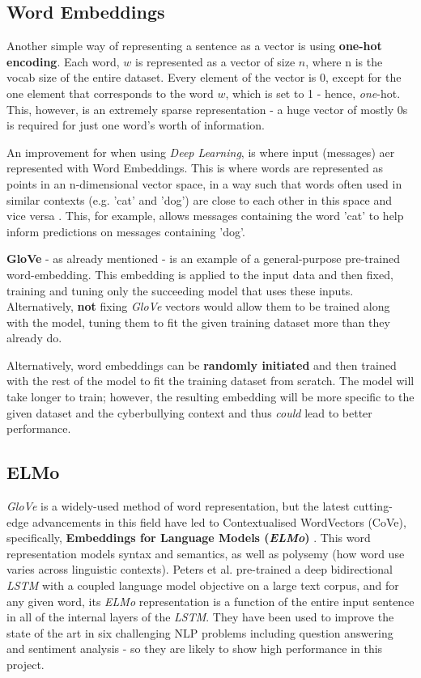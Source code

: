 \documentclass[12pt,a4paper]{article}
\begin{document}
\subsection{Word Embeddings}
Another simple way of representing a sentence as a vector is using \textbf{one-hot encoding}. Each word, $w$ is represented as a vector of size $n$, where n is the vocab size of the entire dataset. Every element of the vector is 0, except for the one element that corresponds to the word $w$, which is set to 1 - hence, \textit{one}-hot. This, however, is an extremely sparse representation - a huge vector of mostly 0s is required for just one word's worth of information.

An improvement for when using \textit{Deep Learning}, is where input (messages) aer represented with Word Embeddings. This is where words are represented as points in an n-dimensional vector space, in a way such that words often used in similar contexts (e.g. 'cat' and 'dog') are close to each other in this space and vice versa \cite[p.464]{DL}. This, for example, allows messages containing the word 'cat' to help inform predictions on messages containing 'dog'.

\textbf{GloVe} \cite{glove} - as already mentioned - is an example of a general-purpose pre-trained word-embedding. This embedding is applied to the input data and then fixed, training and tuning only the succeeding model that uses these inputs. Alternatively, \textbf{not} fixing \textit{GloVe} vectors would allow them to be trained along with the model, tuning them to fit the given training dataset more than they already do.

Alternatively, word embeddings can be \textbf{randomly initiated} and then trained with the rest of the model to fit the training dataset from scratch. The model will take longer to train; however, the resulting embedding will be more specific to the given dataset and the cyberbullying context and thus \textit{could} lead to better performance. 

\subsection{ELMo}
\textit{GloVe} is a widely-used method of word representation, but the latest cutting-edge advancements in this field have led to Contextualised WordVectors (CoVe), specifically, \textbf{Embeddings for Language Models (\textit{ELMo})} \cite{Peters}. This word representation models syntax and semantics, as well as polysemy (how word use varies across linguistic contexts). Peters et al. pre-trained a deep bidirectional \textit{LSTM} with a coupled language model objective on a large text corpus, and for any given word, its \textit{ELMo} representation is a function of the entire input sentence in all of the internal layers of the \textit{LSTM}. They have been used to improve the state of the art in six challenging NLP problems including question answering and sentiment analysis - so they are likely to show high performance in this project.
\end{document}
